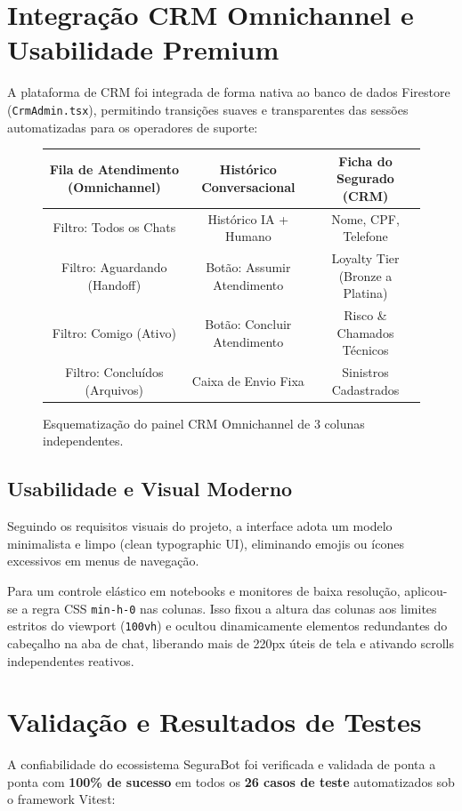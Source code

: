 \documentclass[12pt,a4paper]{article}
\begin{document}
\newpage

\section{Integração CRM Omnichannel e Usabilidade Premium}
A plataforma de CRM foi integrada de forma nativa ao banco de dados Firestore (\texttt{CrmAdmin.tsx}), permitindo transições suaves e transparentes das sessões automatizadas para os operadores de suporte:

\begin{figure}[h]
\centering
\begin{tabular}{|c|c|c|}
\hline
\textbf{Fila de Atendimento (Omnichannel)} & \textbf{Histórico Conversacional} & \textbf{Ficha do Segurado (CRM)} \\
\hline
Filtro: Todos os Chats & Histórico IA + Humano & Nome, CPF, Telefone \\
Filtro: Aguardando (Handoff) & Botão: Assumir Atendimento & Loyalty Tier (Bronze a Platina) \\
Filtro: Comigo (Ativo) & Botão: Concluir Atendimento & Risco \& Chamados Técnicos \\
Filtro: Concluídos (Arquivos) & Caixa de Envio Fixa & Sinistros Cadastrados \\
\hline
\end{tabular}
\caption{Esquematização do painel CRM Omnichannel de 3 colunas independentes.}
\end{figure}

\subsection{Usabilidade e Visual Moderno}
Seguindo os requisitos visuais do projeto, a interface adota um modelo minimalista e limpo (clean typographic UI), eliminando emojis ou ícones excessivos em menus de navegação. 

Para um controle elástico em notebooks e monitores de baixa resolução, aplicou-se a regra CSS \texttt{min-h-0} nas colunas. Isso fixou a altura das colunas aos limites estritos do viewport (\texttt{100vh}) e ocultou dinamicamente elementos redundantes do cabeçalho na aba de chat, liberando mais de 220px úteis de tela e ativando scrolls independentes reativos.

\newpage

\section{Validação e Resultados de Testes}
A confiabilidade do ecossistema SeguraBot foi verificada e validada de ponta a ponta com \textbf{100\% de sucesso} em todos os \textbf{26 casos de teste} automatizados sob o framework Vitest:
\end{document}
